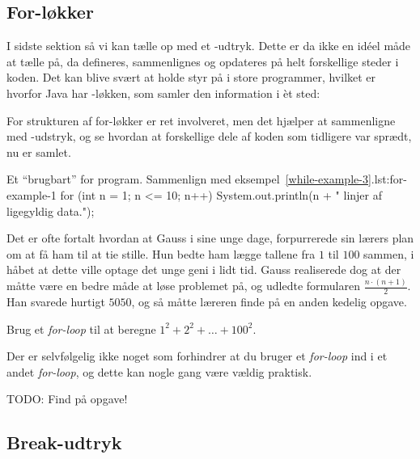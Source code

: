 	\subsection{For-løkker}

		I sidste sektion så vi kan tælle op med et -udtryk.
		Dette er da ikke en idéel måde at tælle på, da 
		defineres, sammenlignes og opdateres på helt forskellige steder i koden.
		Det kan blive svært at holde styr på i store programmer, hvilket er
		hvorfor Java har -løkken, som samler den information i
		èt sted: 



		For strukturen af for-løkker er ret involveret, men det hjælper at
		sammenligne med -udstryk, og se hvordan at forskellige
		dele af koden som tidligere var sprædt, nu er samlet.

		\begin{JavaCode}{Et ``brugbart'' for program. Sammenlign med eksempel~\ref{while-example-3}.}{lst:for-example-1}
			for (int n = 1; n <= 10; n++) {
				System.out.println(n + " linjer af ligegyldig data.");
			}
		\end{JavaCode}

		\begin{exercise}
			Det er ofte fortalt hvordan at Gauss i sine unge dage, forpurrerede sin
			lærers plan om at få ham til at tie stille. Hun bedte ham lægge tallene
			fra \(1\) til \(100\) sammen, i håbet at dette ville optage det unge
			geni i lidt tid. Gauss realiserede dog at der måtte være en bedre måde
			at løse problemet på, og udledte formularen \(\frac{n\cdot(n+1)}{2}\).
			Han svarede hurtigt \(5050\), og så måtte læreren finde på en anden
			kedelig opgave.

			Brug et \emph{for-loop} til at beregne \(1^2+2^2+\dots+100^2\).
		\end{exercise}

		\begin{exercise}
			Der er selvfølgelig ikke noget som forhindrer at du bruger et
			\emph{for-loop} ind i et andet \emph{for-loop}, og dette kan nogle gang
			være vældig praktisk.

			TODO: Find på opgave!
		\end{exercise}

	\subsection{Break-udtryk}

